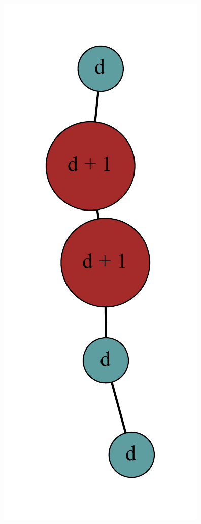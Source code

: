 \documentclass[12pt]{article}
\theoremstyle{plain}
\theoremstyle{definition}
\theoremstyle{remark}
\begin{document}
\begin{figure}[htb]
\includegraphics[scale=0.4]{Superabundance/MaxDegree3Trees/0101011000[2,3,1,1,3].pdf}

\end{figure}
\end{document}
